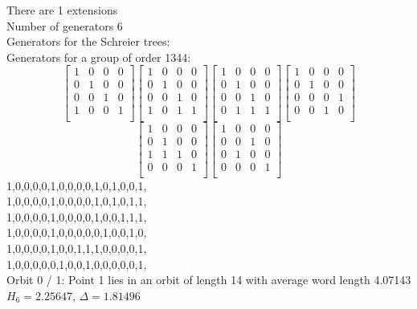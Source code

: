 There are 1 extensions\\
Number of generators 6\\
Generators for the Schreier trees:\\
{\small\arraycolsep=2pt
Generators for a group of order 1344:
$$
\left[
\begin{array}{*{4}{r}}
1 & 0 & 0 & 0\\
0 & 1 & 0 & 0\\
0 & 0 & 1 & 0\\
1 & 0 & 0 & 1\\
\end{array}
\right]
\left[
\begin{array}{*{4}{r}}
1 & 0 & 0 & 0\\
0 & 1 & 0 & 0\\
0 & 0 & 1 & 0\\
1 & 0 & 1 & 1\\
\end{array}
\right]
\left[
\begin{array}{*{4}{r}}
1 & 0 & 0 & 0\\
0 & 1 & 0 & 0\\
0 & 0 & 1 & 0\\
0 & 1 & 1 & 1\\
\end{array}
\right]
\left[
\begin{array}{*{4}{r}}
1 & 0 & 0 & 0\\
0 & 1 & 0 & 0\\
0 & 0 & 0 & 1\\
0 & 0 & 1 & 0\\
\end{array}
\right]
$$
$$
\left[
\begin{array}{*{4}{r}}
1 & 0 & 0 & 0\\
0 & 1 & 0 & 0\\
1 & 1 & 1 & 0\\
0 & 0 & 0 & 1\\
\end{array}
\right]
\left[
\begin{array}{*{4}{r}}
1 & 0 & 0 & 0\\
0 & 0 & 1 & 0\\
0 & 1 & 0 & 0\\
0 & 0 & 0 & 1\\
\end{array}
\right]
$$
1,0,0,0,0,1,0,0,0,0,1,0,1,0,0,1,\\
1,0,0,0,0,1,0,0,0,0,1,0,1,0,1,1,\\
1,0,0,0,0,1,0,0,0,0,1,0,0,1,1,1,\\
1,0,0,0,0,1,0,0,0,0,0,1,0,0,1,0,\\
1,0,0,0,0,1,0,0,1,1,1,0,0,0,0,1,\\
1,0,0,0,0,0,1,0,0,1,0,0,0,0,0,1,\\
}
\noindent Orbit 0 / 1: Point 1 lies in an orbit of length 14 with average word length 4.07143 $H_{6} = 2.25647$, $\Delta = 1.81496$\\
